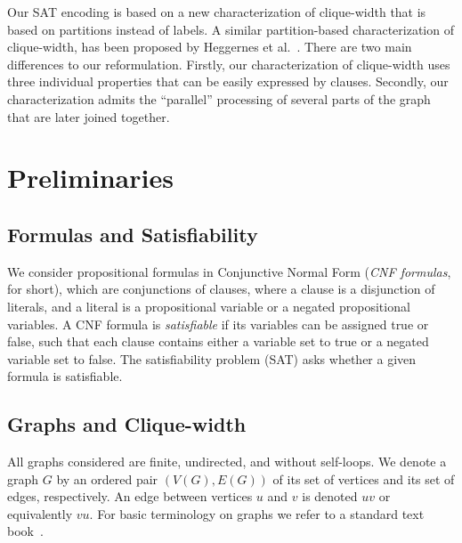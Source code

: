 \documentclass[10pt,usletter]{article}
\theoremstyle{remark}
\begin{document}
Our SAT encoding is based on a new characterization of clique-width
that is based on partitions instead of labels. A similar
partition-based characterization of clique-width, has been proposed by
Heggernes et al.~\cite{HeggernesMeisterRotics11}.  There are two main
differences to our reformulation. Firstly, our characterization of
clique-width uses three individual properties that can be easily
expressed by clauses.  Secondly, our characterization admits the
``parallel'' processing of several parts of the graph that are later
joined together.





\section{Preliminaries}
\label{sec:prelim}


\subsection{Formulas and Satisfiability}
We consider propositional formulas in Conjunctive Normal Form
(\emph{CNF formulas}, for short), which are conjunctions of clauses,
where a clause is a disjunction of literals, and a literal is a
propositional variable or a negated propositional variables.  A CNF
formula is \emph{satisfiable} if its variables can be assigned true or
false, such that each clause contains either a variable set to true or
a negated variable set to false.  The satisfiability problem (SAT)
asks whether a given formula is satisfiable.



\subsection{Graphs and Clique-width}

All graphs considered are finite, undirected, and without self-loops.
We denote a graph $G$ by an ordered pair $(V(G),E(G))$ of its set of
vertices and its set of edges, respectively. An edge between vertices
$u$ and $v$ is denoted $uv$ or equivalently $vu$. For basic
terminology on graphs we refer to a standard text book~\cite{Diestel00}.
\end{document}
